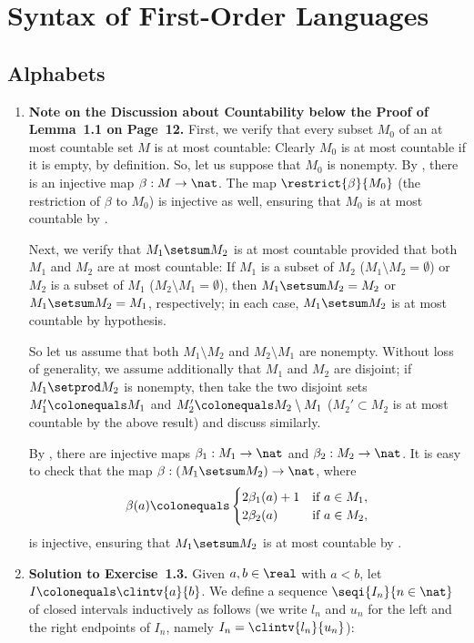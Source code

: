 \chapter{Syntax of First-Order Languages}
\section{Alphabets}
\begin{enumerate}[1.]
%
\item \textbf{Note on the Discussion about Countability below the Proof of Lemma~1.1 on Page~12.} First, we verify that every subset $M_0$ of an at most countable set $M$ is at most countable: Clearly $M_0$ is at most countable if it is empty, by definition. So, let us suppose that $M_0$ is nonempty. By , there is an injective map $\beta: M \to \nat$. The map $\restrict{\beta}{M_0}$ (the restriction of $\beta$ to $M_0$) is injective as well, ensuring that $M_0$ is at most countable by .\par
Next, we verify that $M_1 \setsum M_2$ is at most countable provided that both $M_1$ and $M_2$ are at most countable: If $M_1$ is a subset of $M_2$ ($M_1 \setminus M_2 = \emptyset$) or $M_2$ is a subset of $M_1$ ($M_2 \setminus M_1 = \emptyset$), then $M_1 \setsum M_2 = M_2$ or $M_1 \setsum M_2 = M_1$, respectively; in each case, $M_1 \setsum M_2$ is at most countable by hypothesis.\par
So let us assume that both $M_1 \setminus M_2$ and $M_2 \setminus M_1$ are nonempty. Without loss of generality, we assume additionally that $M_1$ and $M_2$ are disjoint; if $M_1 \setprod M_2$ is nonempty, then take the two disjoint sets $M_1' \colonequals M_1$ and $M_2' \colonequals M_2 \setminus M_1$ ($M_2' \subset M_2$ is at most countable by the above result) and discuss similarly.\par
By , there are injective maps $\beta_1: M_1 \to \nat$ and $\beta_2: M_2 \to \nat$. It is easy to check that the map $\beta: (M_1 \setsum M_2) \to \nat$, where
\[
\beta(a) \colonequals
\begin{cases}
2\beta_1(a) + 1 & \mbox{if \(a \in M_1\)}, \cr
2\beta_2(a)     & \mbox{if \(a \in M_2\)},
\end{cases}
\]
is injective, ensuring that $M_1 \setsum M_2$ is at most countable by .
%
\item \textbf{Solution to Exercise~1.3.} Given $a, b \in \real$ with $a < b$, let $I \colonequals \clintv{a}{b}$. We define a sequence $\seqi{I_n}{n \in \nat}$ of closed intervals inductively as follows (we write $l_n$ and $u_n$ for the left and the right endpoints of $I_n$, namely $I_n = \clintv{l_n}{u_n}$):

\end{enumerate}
